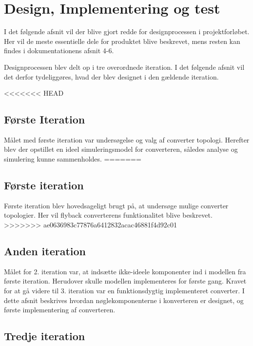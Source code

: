 \chapter{Design, Implementering og test}
I det følgende afsnit vil der blive gjort redde for designprocessen i projektforløbet. Her vil de meste essentielle dele for produktet blive beskrevet, mens resten kan findes i dokumentationens afsnit 4-6.

Designprocessen blev delt op i tre overordnede iteration. I det følgende afsnit vil det derfor tydeliggøres, hvad der blev designet i den gældende iteration. 

<<<<<<< HEAD
\section{Første Iteration}
Målet med første iteration var undersøgelse og valg af converter topologi. Herefter blev der opstillet en ideel simuleringsmodel for converteren, således analyse og simulering kunne sammenholdes. 
=======
\section{Første iteration}
Første iteration blev hovedsageligt brugt på, at undersøge mulige converter topologier. Her vil flyback converterens funktionalitet blive beskrevet. 
>>>>>>> ae0636983c77876a6412832acac46881f4d92c01




\section{Anden iteration}
Målet for 2. iteration var, at indsætte ikke-ideele komponenter ind i modellen fra første iteration. Herudover skulle modellen implementeres for første gang. 
Kravet for at gå videre til 3. iteration var en funktionsdygtig implementeret converter. 
I dette afsnit beskrives hvordan nøglekomponenterne i konverteren er designet, og første implementering af converteren.



\section{Tredje iteration}







	
	
